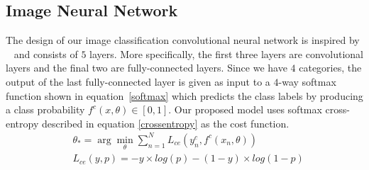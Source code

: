 \documentclass{article} %
\newcommand{\argmin}{\arg\!\min}
\begin{document}
\subsection{Image Neural Network}
\label{sec:imagecnn}
The design of our image classification convolutional neural network is inspired by ~\cite{imagehinton} and consists of $5$ layers. More specifically, the first three layers are convolutional layers and the final two are fully-connected layers. Since we have $4$ categories, the output of the last fully-connected layer is given as input to a $4$-way softmax function shown in equation~\ref{softmax} which predicts the class labels by producing a class probability $f^c(x,\theta) \in [0,1]$. Our proposed model uses softmax cross-entropy described in equation \ref{crossentropy} as the cost function.
\begin{equation} \label{crossentropy}
\begin{align}
& \theta_{*} = \argmin_\theta \sum_{n=1} ^{N} L_{ce}(y^c_{n},f^c(x_n,\theta))\\
& L_{ce}(y,p) = -y \times log(p)-(1-y)\times log(1-p)
\end{align}
\end{equation}
\end{document}

